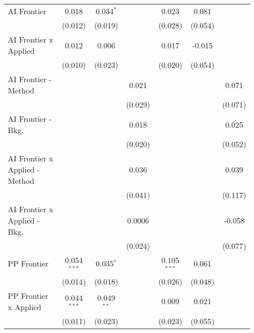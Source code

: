 \begin{tabular}{lcccccc}
   AI Frontier                    & 0.018         & 0.034$^{*}$   &              & 0.023         & 0.081        &   \\   
                                  & (0.012)       & (0.019)       &              & (0.028)       & (0.054)      &   \\   
   AI Frontier x Applied          & 0.012         & 0.006         &              & 0.017         & -0.015       &   \\   
                                  & (0.010)       & (0.023)       &              & (0.020)       & (0.054)      &   \\   
   AI Frontier - Method           &               &               & 0.021        &               &              & 0.071\\   
                                  &               &               & (0.029)      &               &              & (0.071)\\   
   AI Frontier - Bkg.             &               &               & 0.018        &               &              & 0.025\\   
                                  &               &               & (0.020)      &               &              & (0.052)\\   
   AI Frontier x Applied - Method &               &               & 0.036        &               &              & 0.039\\   
                                  &               &               & (0.041)      &               &              & (0.117)\\   
   AI Frontier x Applied - Bkg.   &               &               & 0.0006       &               &              & -0.058\\   
                                  &               &               & (0.024)      &               &              & (0.077)\\   
   PP Frontier                    & 0.054$^{***}$ & 0.035$^{*}$   &              & 0.105$^{***}$ & 0.061        &   \\   
                                  & (0.014)       & (0.018)       &              & (0.026)       & (0.048)      &   \\   
   PP Frontier x Applied          & 0.044$^{***}$ & 0.049$^{**}$  &              & 0.009         & 0.021        &   \\   
                                  & (0.011)       & (0.023)       &              & (0.023)       & (0.055)      &   \\   

\end{tabular}
